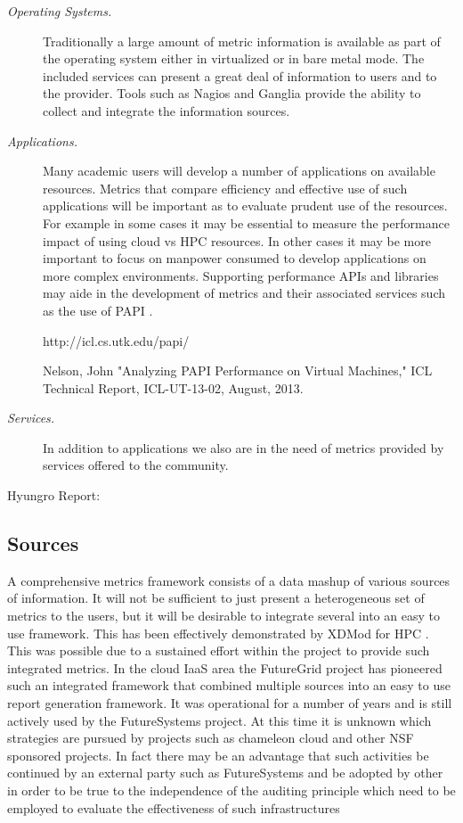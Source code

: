 \documentclass{sig-alternate-05-2015}
\begin{document}
\begin{description}
\item[\it Operating Systems.] Traditionally a large amount of metric
  information is available as part of the operating system either in
  virtualized or in bare metal mode. The included services can present a
  great deal of information to users and to the provider. Tools such
  as Nagios and Ganglia provide  the ability to collect and integrate
  the information sources.

\item[\it Applications.] Many academic users will develop a number of
  applications on available resources. Metrics that compare efficiency
  and effective use of such applications will be important as to
  evaluate prudent use of the resources. For example in some cases it
  may be essential to measure the performance impact of using cloud vs
  HPC resources. In other cases it may be more important to focus on
  manpower consumed to develop applications on more complex
  environments. Supporting performance APIs and libraries may aide in
  the development of metrics and their associated services such as the
  use of PAPI \cite{papi2014}.

http://icl.cs.utk.edu/papi/


Nelson, John "Analyzing PAPI Performance on Virtual Machines," ICL
Technical Report, ICL-UT-13-02, August, 2013.

\item[\it Services.] In addition to applications we also are in the
  need of metrics provided by services offered to the community. 

\end{description}


Hyungro Report: \cite{LeeFGresource}

\subsection{Sources}

A comprehensive metrics framework consists of a data mashup of various
sources of information. It will not be sufficient to just present a
heterogeneous set of metrics to the users, but it will be desirable to
integrate several into an easy to use framework. This has been
effectively demonstrated by XDMod for HPC
\cite{las14cloudmeshmultiple,las14Impact,las12xdmod-kernel}. This was
possible due to a sustained effort within the project to provide such
integrated metrics. In the cloud IaaS area the FutureGrid project has
pioneered such an integrated framework that combined multiple sources
into an easy to use report generation framework. It was operational
for a number of years and is still actively used by the FutureSystems
project. At this time it is unknown which strategies are pursued by
projects such as chameleon cloud and other NSF sponsored projects.  In
fact there may be an advantage that such activities be continued by an
external party such as FutureSystems and be adopted by other in order
to be true to the independence of the auditing principle which need to
be employed to evaluate the effectiveness of such infrastructures
\end{document}
